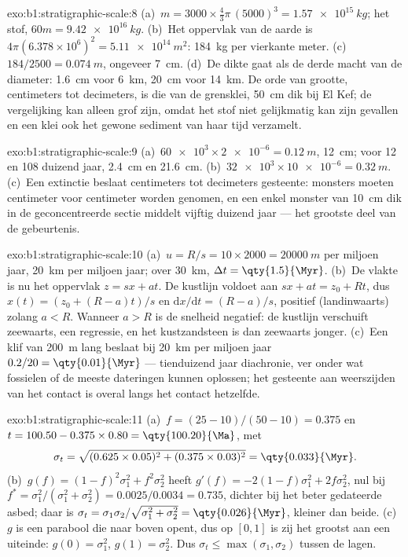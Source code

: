 \begin{solution}{exo:b1:stratigraphic-scale:8}
(a)~$m = 3000 \times \frac43\pi\,(5000)^3 = \qty{1.57e15}{kg}$; het stof,
$60m = \qty{9.42e16}{kg}$. (b)~Het oppervlak van de aarde is $4\pi(6.378\times10^6)^2
= \qty{5.11e14}{m^2}$: \qty{184}{kg} per vierkante meter. (c)~$184/2500 =
\qty{0.074}{m}$, ongeveer \qty{7}{cm}. (d)~De dikte gaat als de derde macht van de
diameter: \qty{1.6}{cm} voor \qty{6}{km}, \qty{20}{cm} voor \qty{14}{km}. De orde
van grootte, centimeters tot decimeters, is die van de grensklei,
\qty{50}{cm} dik bij El Kef; de vergelijking kan alleen grof zijn, omdat het stof niet
gelijkmatig kan zijn gevallen en een klei ook het gewone sediment van haar tijd verzamelt.
\end{solution}

\begin{solution}{exo:b1:stratigraphic-scale:9}
(a)~$\num{60e3} \times \num{2e-6} = \qty{0.12}{m}$, \qty{12}{cm}; voor 12 en 108
duizend jaar, \qty{2.4}{cm} en \qty{21.6}{cm}. (b)~$\num{32e3} \times
\num{10e-6} = \qty{0.32}{m}$. (c)~Een extinctie beslaat centimeters tot decimeters
gesteente: monsters moeten centimeter voor centimeter worden genomen, en een enkel
monster van \qty{10}{cm} dik in de geconcentreerde sectie middelt vijftig duizend jaar ---
het grootste deel van de gebeurtenis.
\end{solution}

\begin{solution}{exo:b1:stratigraphic-scale:10}
(a)~$u = R/s = 10 \times 2000 = \qty{20000}{m}$ per miljoen jaar,
\qty{20}{km} per miljoen jaar; over \qty{30}{km}, $\Delta t = \qty{1.5}{\Myr}$.
(b)~De vlakte is nu het oppervlak $z = s x + a t$. De kustlijn voldoet aan
$s x + a t = z_0 + R t$, dus $x(t) = (z_0 + (R - a)t)/s$ en
$\mathrm dx/\mathrm dt = (R - a)/s$, positief (landinwaarts) zolang $a < R$. Wanneer
$a > R$ is de snelheid negatief: de kustlijn verschuift zeewaarts, een regressie, en
het kustzandsteen is dan zeewaarts jonger. (c)~Een klif van \qty{200}{m} lang beslaat
bij \qty{20}{km} per miljoen jaar $0.2/20 = \qty{0.01}{\Myr}$ --- tienduizend
jaar diachronie, ver onder wat fossielen of de meeste dateringen kunnen oplossen; het gesteente
aan weerszijden van het contact is overal langs het contact hetzelfde.
\end{solution}

\begin{solution}{exo:b1:stratigraphic-scale:11}
(a)~$f = (25 - 10)/(50 - 10) = 0.375$ en $t = 100.50 - 0.375 \times 0.80 =
\qty{100.20}{\Ma}$, met
\[
  \sigma_t = \sqrt{(0.625 \times 0.05)^2 + (0.375 \times 0.03)^2} = \qty{0.033}{\Myr}.
\] (b)~$g(f) = (1 - f)^2\sigma_1^2 + f^2\sigma_2^2$
heeft $g'(f) = -2(1 - f)\sigma_1^2 + 2f\sigma_2^2$, nul bij $f^* =
\sigma_1^2/(\sigma_1^2 + \sigma_2^2) = 0.0025/0.0034 = 0.735$, dichter bij het beter
gedateerde asbed; daar is $\sigma_t = \sigma_1\sigma_2/\sqrt{\sigma_1^2 + \sigma_2^2} =
\qty{0.026}{\Myr}$, kleiner dan beide. (c)~$g$ is een parabool die naar boven opent, dus
op $[0, 1]$ is zij het grootst aan een uiteinde: $g(0) = \sigma_1^2$, $g(1) = \sigma_2^2$.
Dus $\sigma_t \le \max(\sigma_1, \sigma_2)$ tussen de lagen.
\end{solution}

